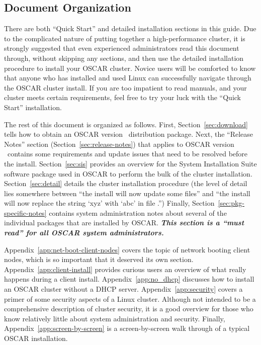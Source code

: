 \endchange


\subsection{Document Organization}

There are both ``Quick Start'' and detailed installation sections in
this guide. Due to the complicated nature of putting together a
high-performance cluster, it is strongly suggested that even
experienced administrators read this document through, without
skipping any sections, and then use the detailed installation
procedure to install your OSCAR cluster.  Novice users will be
comforted to know that anyone who has installed and used Linux can
successfully navigate through the OSCAR cluster install.  If you are
too impatient to read manuals, and your cluster meets certain
requirements, feel free to try your luck with the ``Quick Start''
installation.

The rest of this document is organized as follows.  
%
First, Section~\ref{sec:download} tells how to obtain an OSCAR version
\oscarversion\ distribution package.
%
Next, the ``Release Notes'' section (Section~\ref{sec:release-notes})
that applies to OSCAR version \oscarversion\ contains some
requirements and update issues that need to be resolved before the
install.
%
Section~\ref{sec:sis} provides an overview for the System Installation
Suite software package used in OSCAR to perform the bulk of the
cluster installation.
%
Section~\ref{sec:detail} details the cluster installation procedure
(the level of detail lies somewhere between ``the install will now
update some files'' and ``the install will now replace the string
`xyz' with `abc' in file .'')
%
Finally, Section~\ref{sec:pkg-specific-notes} contains system
administration notes about several of the individual packages that are
installed by OSCAR.  {\bf\em This section is a ``must read'' for all
  OSCAR system administrators.}

Appendix~\ref{app:net-boot-client-nodes} covers the topic of network
booting client nodes, which is so important that it deserved its own
section.  
%
Appendix~\ref{app:client-install} provides curious users an overview
of what really happens during a client install.
%
Appendix~\ref{app:no_dhcp} discusses how to install an OSCAR cluster
without a DHCP server.
%
Appendix~\ref{app:security} covers a primer of some security aspects
of a Linux cluster.  Although not intended to be a comprehensive
description of cluster security, it is a good overview for those who
know relatively little about system administration and security.
%
Finally, Appendix~\ref{app:screen-by-screen} is a screen-by-screen
walk through of a typical OSCAR installation.


